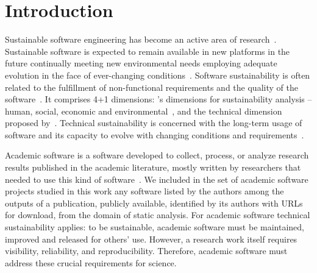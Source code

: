 
\section{Introduction}

Sustainable software engineering has become an active area of
research~\cite{2012:penzenstadler}.
Sustainable software is expected to remain available in new platforms in the
future continually meeting new environmental needs employing adequate evolution
in the face of ever-changing conditions~\cite{allen2017engineering}.
%
Software sustainability is often related to
the fulfillment of non-functional requirements and 
the quality of the software~\cite{2014:penzenstadler,2016:hthesis}.
It comprises 4+1 dimensions:    
\citeauthor{2002:goodland}'s dimensions for sustainability analysis -- human,
social, economic and environmental~\cite{2002:goodland}, and the technical
dimension proposed by~\citet{2013:penzenstadler}.
%
Technical sustainability is concerned with the long-term usage of software and
its capacity to evolve with changing conditions and
requirements~\cite{2012:penzenstadler,2013:penzenstadler}.

Academic software is a software developed to collect, process, or analyze research results published in the academic literature, mostly written by researchers that needed to use this kind of software~\cite{allen2017engineering}. We included in the set of academic software projects studied in this work any software listed by the authors among the outputs of a publication, publicly available, identified by its authors with URLs for download, from the domain of static analysis.
%
For academic software technical sustainability applies: to be sustainable, academic software must be maintained, improved and released for others’ use. However, a research work itself requires visibility, reliability, and reproducibility. Therefore, academic software must address these crucial requirements for science. 

